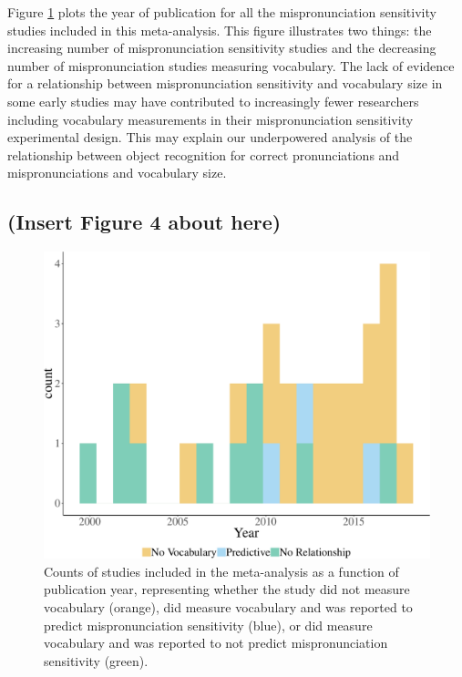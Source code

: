 \documentclass[man]{apa6}
\theoremstyle{definition}
\theoremstyle{definition}
\theoremstyle{definition}
\theoremstyle{remark}
\begin{document}
Figure \ref{fig:Vocab-describe1} plots the year of publication for all
the mispronunciation sensitivity studies included in this meta-analysis.
This figure illustrates two things: the increasing number of
mispronunciation sensitivity studies and the decreasing number of
mispronunciation studies measuring vocabulary. The lack of evidence for
a relationship between mispronunciation sensitivity and vocabulary size
in some early studies may have contributed to increasingly fewer
researchers including vocabulary measurements in their mispronunciation
sensitivity experimental design. This may explain our underpowered
analysis of the relationship between object recognition for correct
pronunciations and mispronunciations and vocabulary size.

\subsection{(Insert Figure 4 about
here)}\label{insert-figure-4-about-here}

\begin{figure}
\centering
\includegraphics{VonHolzenBergmann_MPMetaAnalysis_files/figure-latex/Vocab-describe1-1.pdf}
\caption{\label{fig:Vocab-describe1}Counts of studies included in the
meta-analysis as a function of publication year, representing whether
the study did not measure vocabulary (orange), did measure vocabulary
and was reported to predict mispronunciation sensitivity (blue), or did
measure vocabulary and was reported to not predict mispronunciation
sensitivity (green).}
\end{figure}
\end{document}
